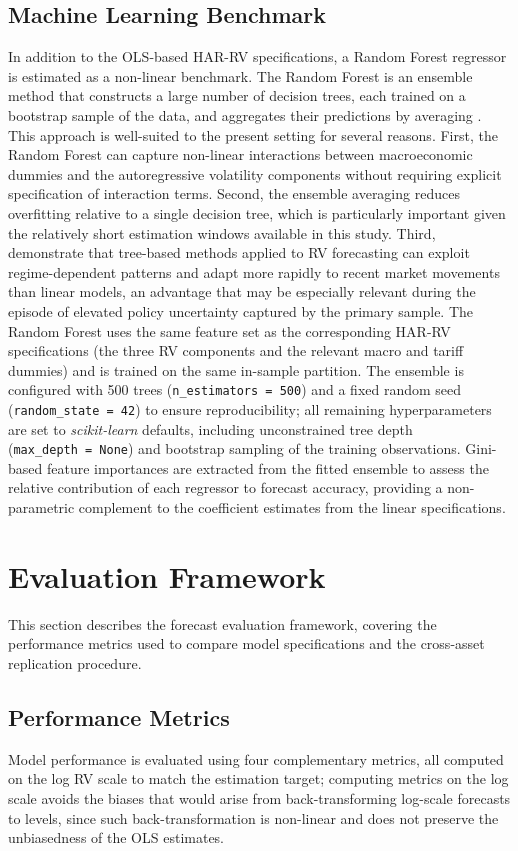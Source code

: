 \documentclass[12pt,a4paper]{report}
\begin{document}
\subsection{Machine Learning Benchmark}
In addition to the OLS-based HAR-RV specifications, a Random Forest regressor is estimated as a non-linear benchmark. The Random Forest is an ensemble method that constructs a large number of decision trees, each trained on a bootstrap sample of the data, and aggregates their predictions by averaging \citep{Breiman2001}. This approach is well-suited to the present setting for several reasons. First, the Random Forest can capture non-linear interactions between macroeconomic dummies and the autoregressive volatility components without requiring explicit specification of interaction terms. Second, the ensemble averaging reduces overfitting relative to a single decision tree, which is particularly important given the relatively short estimation windows available in this study. Third, \citet{Christensen2023} demonstrate that tree-based methods applied to RV forecasting can exploit regime-dependent patterns and adapt more rapidly to recent market movements than linear models, an advantage that may be especially relevant during the episode of elevated policy uncertainty captured by the primary sample. The Random Forest uses the same feature set as the corresponding HAR-RV specifications (the three RV components and the relevant macro and tariff dummies) and is trained on the same in-sample partition. The ensemble is configured with 500 trees (\texttt{n\_estimators~=~500}) and a fixed random seed (\texttt{random\_state~=~42}) to ensure reproducibility; all remaining hyperparameters are set to \textit{scikit-learn} defaults, including unconstrained tree depth (\texttt{max\_depth~=~None}) and bootstrap sampling of the training observations. Gini-based feature importances are extracted from the fitted ensemble to assess the relative contribution of each regressor to forecast accuracy, providing a non-parametric complement to the coefficient estimates from the linear specifications.

\section{Evaluation Framework}
This section describes the forecast evaluation framework, covering the performance metrics used to compare model specifications and the cross-asset replication procedure.

\subsection{Performance Metrics}
Model performance is evaluated using four complementary metrics, all computed on the log RV scale to match the estimation target; computing metrics on the log scale avoids the biases that would arise from back-transforming log-scale forecasts to levels, since such back-transformation is non-linear and does not preserve the unbiasedness of the OLS estimates.
\end{document}
